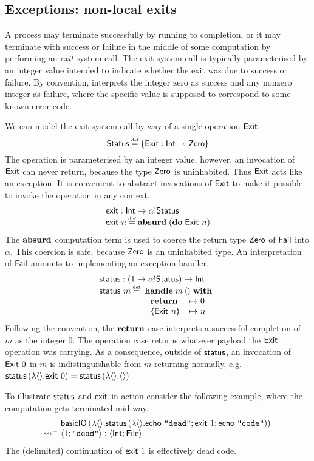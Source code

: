 \documentclass[12pt,phd,lfcs,twoside,openright,logo,leftchapter,normalheadings]{infthesis}
\theoremstyle{plain}
\theoremstyle{definition}
\begin{document}
\subsection{Exceptions: non-local exits}
\label{sec:tiny-unix-exit}

A process may terminate successfully by running to completion, or it
may terminate with success or failure in the middle of some
computation by performing an \emph{exit} system call. The exit system
call is typically parameterised by an integer value intended to
indicate whether the exit was due to success or failure. By
convention, \UNIX{} interprets the integer zero as success and any
nonzero integer as failure, where the specific value is supposed to
correspond to some known error code.
%

We can model the exit system call by way of a single operation
$\mathsf{Exit}$.
%
\[
  \Status \defas \{\Exit : \Int \opto \Zero\}
\]
%
The operation is parameterised by an integer value, however, an
invocation of $\mathsf{Exit}$ can never return, because the type $\mathsf{Zero}$ is
uninhabited. Thus $\mathsf{Exit}$ acts like an exception.
%
It is convenient to abstract invocations of $\mathsf{Exit}$ to make it
possible to invoke the operation in any context.
%
\[
  \bl
    \exit : \Int \to \alpha \eff \Status\\
    \exit~n \defas \Absurd\;(\Do\;\Exit~n)
  \el
\]
%
The $\mathbf{absurd}$ computation term is used to coerce the return type
$\mathsf{Zero}$ of $\mathsf{Fail}$ into $\alpha$. This coercion is safe, because
$\mathsf{Zero}$ is an uninhabited type.
%
An interpretation of $\mathsf{Fail}$ amounts to implementing an exception
handler.
%
\[
  \bl
    \status : (\UnitType \to \alpha \eff \Status) \to \Int\\
    \status~m \defas
       \ba[t]{@{~}l}
         \Handle\;m\,\Unit\;\With\\
           ~\ba{@{~}l@{~}c@{~}l}
              \Return\;\_ &\mapsto& 0\\
              \ExnCase{\Exit}{n} &\mapsto& n
           \ea
       \ea
  \el
\]
%
Following the \UNIX{} convention, the $\mathbf{return}$-case interprets a
successful completion of $m$ as the integer $0$. The operation case
returns whatever payload the $\mathsf{Exit}$ operation was carrying. As a
consequence, outside of $\mathsf{status}$, an invocation of $\mathsf{Exit}~0$ in $m$
is indistinguishable from $m$ returning normally, e.g.
$\mathsf{status}\,(\lambda\langle  \rangle.\mathsf{exit}~0) = \mathsf{status}\,(\lambda\langle  \rangle.\langle  \rangle)$.

To illustrate $\mathsf{status}$ and $\mathsf{exit}$ in action consider the following
example, where the computation gets terminated mid-way.
%
\[
  \ba{@{~}l@{~}l}
    &\bl
      \basicIO\,(\lambda\Unit.
         \status\,(\lambda\Unit.
            \echo~\strlit{dead};\exit~1;\echo~\strlit{code}))
     \el\\
    \reducesto^+& \Record{1;\strlit{dead}} : \Record{\Int;\UFile}
  \ea
\]
%
The (delimited) continuation of $\mathsf{exit}~1$ is effectively dead code.
\end{document}
